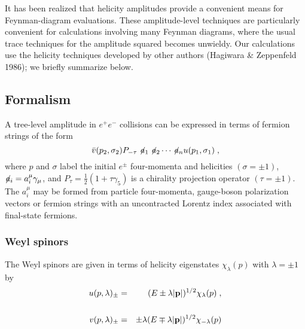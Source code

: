 \documentclass[11pt,twoside]{article}  %
\begin{document}
It has been realized that helicity amplitudes provide a convenient
means for Feynman-diagram evaluations.  These amplitude-level
techniques are particularly convenient for calculations involving many
Feynman diagrams, where the usual trace techniques for the amplitude
squared becomes unwieldy.  Our calculations use the helicity
techniques developed by other authors (Hagiwara \& Zeppenfeld 1986);
we briefly summarize below.

\subsection{Formalism} \label{hairymath}


A tree-level amplitude in $e^+e^-$ collisions can be expressed in
terms of fermion strings of the form
\begin{equation}
\bar v(p_2,\sigma_2)P_{-\tau}\not\!a_1\not\!a_2\cdots
\not\!a_nu(p_1,\sigma_1)\;,
\end{equation}
where $p$ and $\sigma$ label the initial $e^{\pm}$ four-momenta and
helicities $(\sigma = \pm 1)$, $\not\!a_i=a^\mu_i\gamma_\mu$, and
$P_\tau=\frac{1}{2}(1+\tau\gamma_5)$ is a chirality projection
operator $(\tau = \pm1)$.  The $a^\mu_i$ may be formed from particle
four-momenta, gauge-boson polarization vectors or fermion strings with
an uncontracted Lorentz index associated with final-state fermions.

\subsubsection{Weyl spinors}

The Weyl spinors are given in terms of helicity eigenstates
$\chi_\lambda(p)$ with $\lambda=\pm1$ by
\begin{eqnarray}
u(p,\lambda)_\pm & = & (E\pm\lambda|{\bf p}|)^{1/2}\chi_\lambda(p)\;,
\nonumber \\ & & \\
v(p,\lambda)_\pm & = & \pm\lambda(E\mp\lambda|{\bf p}|)^{1/2}\chi
_{-\lambda}(p) \nonumber
\end{eqnarray}
\end{document}
